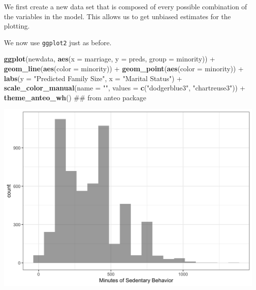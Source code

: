 \documentclass[]{tufte-book}
\newenvironment{Shaded}{}{}
\newcommand{\KeywordTok}[1]{\textcolor[rgb]{0.00,0.44,0.13}{\textbf{#1}}}
\newcommand{\DataTypeTok}[1]{\textcolor[rgb]{0.56,0.13,0.00}{#1}}
\newcommand{\StringTok}[1]{\textcolor[rgb]{0.25,0.44,0.63}{#1}}
\newcommand{\OperatorTok}[1]{\textcolor[rgb]{0.40,0.40,0.40}{#1}}
\newcommand{\NormalTok}[1]{#1}
\theoremstyle{definition}
\theoremstyle{definition}
\theoremstyle{remark}
\begin{document}
We first create a new data set that is composed of every possible
combination of the variables in the model. This allows us to get
unbiased estimates for the plotting.

\begin{Shaded}
\end{Shaded}

We now use \texttt{ggplot2} just as before.

\begin{Shaded}
\begin{Highlighting}[]
\KeywordTok{ggplot}\NormalTok{(newdata, }\KeywordTok{aes}\NormalTok{(}\DataTypeTok{x =}\NormalTok{ marriage, }\DataTypeTok{y =}\NormalTok{ preds, }\DataTypeTok{group =}\NormalTok{ minority)) }\OperatorTok{+}\StringTok{ }
\StringTok{    }\KeywordTok{geom_line}\NormalTok{(}\KeywordTok{aes}\NormalTok{(}\DataTypeTok{color =}\NormalTok{ minority)) }\OperatorTok{+}\StringTok{ }\KeywordTok{geom_point}\NormalTok{(}\KeywordTok{aes}\NormalTok{(}\DataTypeTok{color =}\NormalTok{ minority)) }\OperatorTok{+}\StringTok{ }
\StringTok{    }\KeywordTok{labs}\NormalTok{(}\DataTypeTok{y =} \StringTok{"Predicted Family Size"}\NormalTok{, }\DataTypeTok{x =} \StringTok{"Marital Status"}\NormalTok{) }\OperatorTok{+}\StringTok{ }
\StringTok{    }\KeywordTok{scale_color_manual}\NormalTok{(}\DataTypeTok{name =} \StringTok{""}\NormalTok{, }\DataTypeTok{values =} \KeywordTok{c}\NormalTok{(}\StringTok{"dodgerblue3"}\NormalTok{, }
        \StringTok{"chartreuse3"}\NormalTok{)) }\OperatorTok{+}\StringTok{ }\KeywordTok{theme_anteo_wh}\NormalTok{()  ## from anteo package}
\end{Highlighting}
\end{Shaded}

\includegraphics{_main_files/figure-latex/unnamed-chunk-78-1}
\end{document}
